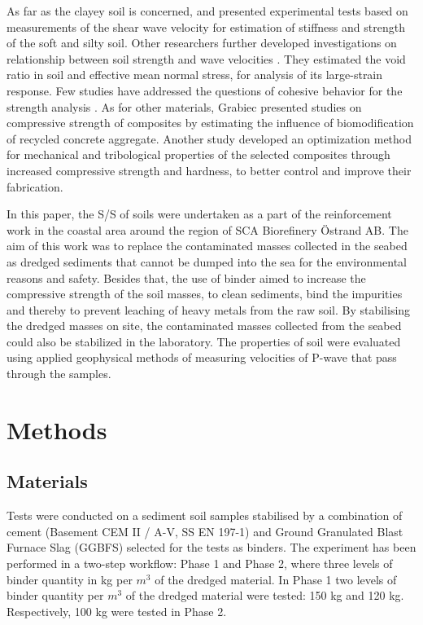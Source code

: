 \documentclass[10pt,twoside,twocolumn,a4paper]{article}
\begin{document}
As far as the clayey soil is concerned, \cite{Cheshomi} and \cite{Wuetal2021} presented experimental tests based on measurements of the shear wave velocity for estimation of stiffness and strength of the soft and silty soil. Other researchers further developed investigations on relationship between soil strength and wave velocities \cite{Liuetal2020}. They estimated the void ratio in soil and effective mean normal stress, for analysis of its large-strain response. Few studies have addressed the questions of cohesive behavior for the strength analysis \cite{Gecys}. As for other materials, Grabiec \cite{Grabiec2019} presented studies on compressive strength of composites by estimating the influence of biomodification of recycled concrete aggregate. Another study \cite{Manikandan} developed an optimization method for mechanical and tribological properties of the selected composites through increased compressive strength and hardness, to better control and improve their fabrication. 

In this paper, the S/S of soils were undertaken as a part of the reinforcement work in the coastal area around the region of SCA Biorefinery Östrand AB. The aim of this work was to replace the contaminated masses collected in the seabed as dredged sediments that cannot be dumped into the sea for the environmental reasons and safety. Besides that, the use of binder aimed to increase the compressive strength of the soil masses, to clean sediments, bind the impurities and thereby to prevent leaching of heavy metals from the raw soil. By stabilising the dredged masses on site, the contaminated masses collected from the seabed could also be stabilized in the laboratory. The properties of soil were evaluated using applied geophysical methods of measuring velocities of P-wave that pass through the samples.

\section{Methods}

\subsection{Materials}
Tests were conducted on a sediment soil samples stabilised by a combination of cement (Basement CEM II / A-V, SS EN 197-1) and Ground Granulated Blast Furnace Slag (GGBFS) selected for the tests as binders. The experiment has been performed in a two-step workflow: Phase 1 and Phase 2, where three levels of binder quantity in kg per $m^3$ of the dredged material. In Phase 1 two levels of binder quantity per $m^3$ of the dredged material were tested: 150 kg and 120 kg. Respectively, 100 kg were tested in Phase 2. 
\end{document}
